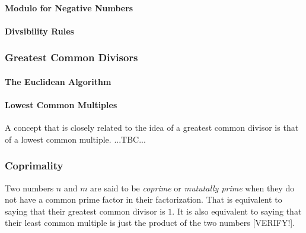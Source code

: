 



\paragraph{Modulo for Negative Numbers}



\paragraph{Divsibility Rules}

\subsubsection{Greatest Common Divisors}


\paragraph{The Euclidean Algorithm}


\paragraph{Lowest Common Multiples}
A concept that is closely related to the idea of a greatest common divisor is that of a lowest common multiple. ...TBC...






\subsubsection{Coprimality}
Two numbers $n$ and $m$ are said to be \emph{coprime} or \emph{mututally prime} when they do not have a common prime factor in their factorization. That is equivalent to saying that their greatest common divisor is $1$. It is also equivalent to saying that their least common multiple is just the product of the two numbers [VERIFY!].

